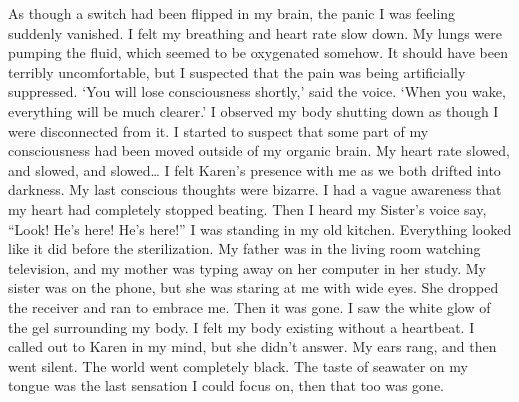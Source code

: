 \documentclass[a4paper]{article}
\begin{document}
As though a switch had been flipped in my brain, the panic I was feeling suddenly vanished. I felt my breathing and heart rate slow down. My lungs were pumping the fluid, which seemed to be oxygenated somehow. It should have been terribly uncomfortable, but I suspected that the pain was being artificially suppressed.
‘You will lose consciousness shortly,’ said the voice. ‘When you wake, everything will be much clearer.’
I observed my body shutting down as though I were disconnected from it. I started to suspect that some part of my consciousness had been moved outside of my organic brain.
My heart rate slowed, and slowed, and slowed… I felt Karen’s presence with me as we both drifted into darkness.
My last conscious thoughts were bizarre. I had a vague awareness that my heart had completely stopped beating. Then I heard my Sister’s voice say, “Look! He’s here! He’s here!”
I was standing in my old kitchen. Everything looked like it did before the sterilization. My father was in the living room watching television, and my mother was typing away on her computer in her study. My sister was on the phone, but she was staring at me with wide eyes. She dropped the receiver and ran to embrace me.
Then it was gone. I saw the white glow of the gel surrounding my body. I felt my body existing without a heartbeat. I called out to Karen in my mind, but she didn’t answer.
My ears rang, and then went silent. The world went completely black. The taste of seawater on my tongue was the last sensation I could focus on, then that too was gone.
\end{document}

